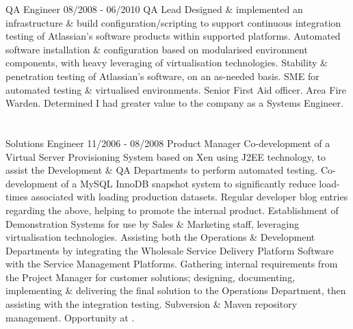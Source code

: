  QA Engineer
\lskip
{} 08/2008 - 06/2010
 QA Lead
 Designed \& implemented an infrastructure \& build configuration/scripting to support continuous integration testing of Atlassian's software products within supported platforms. Automated software installation \& configuration based on modularised environment components, with heavy leveraging of virtualisation technologies.
 Stability \& penetration testing of Atlassian's software, on an as-needed basis.
\dashtopic SME for automated testing \& virtualised environments.
\dashtopic Senior First Aid officer.
\dashtopic Area Fire Warden.
 Determined I had greater value to the company as a Systems Engineer.

\section{\DOT}

\lskip
{} Solutions Engineer
 11/2006 - 08/2008
 Product Manager
 Co-development of a Virtual Server Provisioning System based on Xen using J2EE technology, to assist the Development \& QA Departments to perform automated testing.
\dashtopic Co-development of a MySQL InnoDB snapshot system to significantly reduce load-times associated with loading production datasets.
\dashtopic Regular developer blog entries regarding the above, helping to promote the internal product.
\dashtopic Establishment of Demonstration Systems for use by Sales \& Marketing staff, leveraging virtualisation technologies.
 Assisting both the Operations \& Development Departments by integrating the Wholesale Service Delivery Platform Software with the Service Management Platforms.
\dashtopic Gathering internal requirements from the Project Manager for customer solutions; designing, documenting, implementing \& delivering the final solution to the Operations Department, then assisting with the integration testing.
\dashtopic Subversion \& Maven repository management.
 Opportunity at \ATL.
\pskip

